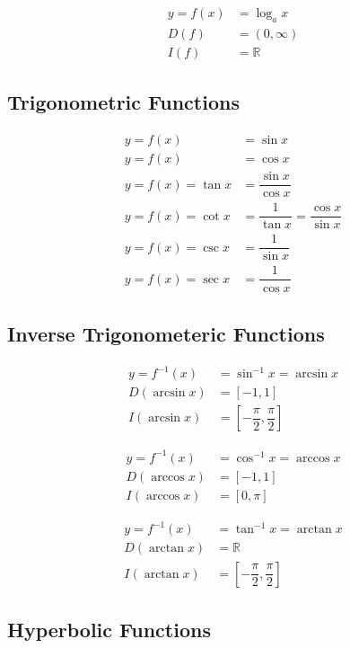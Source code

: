 \documentclass[fleqn]{article}
\theoremstyle{definition}
\theoremstyle{theorem}
\theoremstyle{remark}
\begin{document}
\begin{align}
	y = f(x) &= \log_{a} {x} \label{logarithmic function} \\
	D(f) &= (0,\infty) \label{domain of logarithmic function} \\
	I(f) &= \mathbb{R} \label{image of logarithmic function}
\end{align}

\subsection{Trigonometric Functions}

\begin{align}
	y = f(x) &= \sin x \\
	y = f(x) &= \cos x \\
	y = f(x) = \tan x &= \dfrac{\sin x}{\cos x} \\
	y = f(x)  = \cot x &= \dfrac{1}{\tan x} = \dfrac{\cos x}{\sin x} \\
	y = f(x) = \csc x &= \dfrac{1}{\sin x} \\
	y = f(x) = \sec x &= \dfrac{1}{\cos x} 
\end{align}

\subsection{Inverse Trigonometeric Functions}

\begin{align}
	y = f^{-1}(x) &= \sin^{-1} x = \arcsin x \\
	D(\arcsin x) &= [-1,1] \\
	I(\arcsin x) &= [-\dfrac{\pi}{2}, \dfrac{\pi}{2}]
\end{align}

\begin{align}
	y = f^{-1}(x) &= \cos^{-1} x = \arccos x \\
	D(\arccos x) &= [-1,1] \\
	I(\arccos x) &= [0,\pi]
\end{align}

\begin{align}
	y = f^{-1}(x) &= \tan^{-1} x = \arctan x \\
	D(\arctan x) &= \mathbb{R} \\
	I(\arctan x) &= [-\dfrac{\pi}{2}, \dfrac{\pi}{2}]
\end{align}

\subsection{Hyperbolic Functions}
\end{document}
